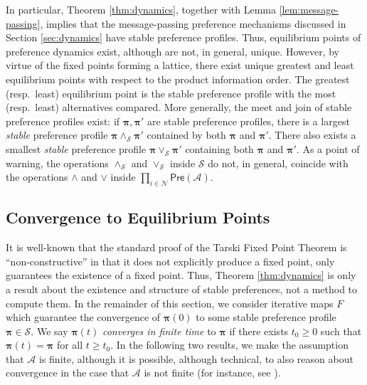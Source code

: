 \documentclass[conference]{ieeeconf}
\newcommand{\N}{\mathcal{N}}
\newcommand{\A}{\mathcal{A}}
\renewcommand{\SS}{\mathcal{S}}
\newcommand{\Pref}{\mathsf{Pre}}
\newcommand{\profile}{\boldsymbol{\pi}}
\newcommand{\join}{\vee}
\newcommand{\meet}{\wedge}
\renewcommand{\geq}{\geqslant}
\DeclareMathOperator{\Aggregate}{Aggregate}
\newtheorem{corollary}{Corollary}
\begin{document}
In particular, Theorem \ref{thm:dynamics}, together with Lemma \ref{lem:message-passing}, implies that the message-passing preference mechanisms discussed in Section \ref{sec:dynamics} have stable preference profiles. Thus, equilibrium points of preference dynamics exist, although are not, in general, unique. However, by virtue of the fixed points forming a lattice, there exist unique greatest and least equilibrium points with respect to the product information order. The greatest (resp.~least) equilibrium point is the stable preference profile with the most (resp.~least) alternatives compared. More generally, the meet and join of stable preference profiles exist: if $\profile, \profile'$ are stable preference profiles, there is a largest \emph{stable} preference profile $\profile \meet_{\SS} \profile'$ contained by both $\profile$ and $\profile'$. There also exists a smallest \emph{stable} preference profile $\profile \join_{\SS} \profile'$ containing both $\profile$ and $\profile'$. As a point of warning, the operations $\meet_\SS$ and $\join_\SS$ inside $\SS$ do not, in general, coincide with the operations $\meet$ and $\join$ inside $\prod_{i \in \N}  \Pref(\A)$.


\vspace{-0.25em}
\subsection{Convergence to Equilibrium Points}
\vspace{-0.25em}

It is well-known that the standard proof of the Tarski Fixed Point Theorem is ``non-constructive'' \cite{cousot1979} in that it does not explicitly produce a fixed point, only guarantees the existence of a fixed point. Thus, Theorem \ref{thm:dynamics} is only a result about the existence and structure of stable preferences, not a method to compute them. In the remainder of this section, we consider iterative maps $F$ which guarantee the convergence of $\profile(0)$ to some stable preference profile $\profile \in \SS$. We say $\profile(t)$ \emph{converges in finite time} to $\profile$ if there exists $t_0 \geq 0$ such that $\profile(t) = \profile$ for all $t \geq t_0$. In the following two results, we make the assumption that $\A$ is finite, although it is possible, although technical, to also reason about convergence in the case that $\A$ is not finite (for instance, see \cite[Theorem 12.9]{roman2008}).
    
\end{document}
